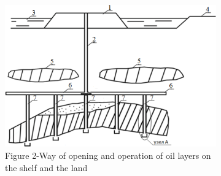 \begin{figure}[H]
    \centering
    \begin{subfigure}[b]{0.65\textwidth}
      \centering
      \includegraphics[width=\linewidth]{assets/1340}
      \caption*{Figure 2-Way of opening and operation of oil layers on the shelf and the land}
    \end{subfigure}
    \begin{subfigure}[b]{0.25\textwidth}
      \centering

\end{subfigure}
\end{figure}
